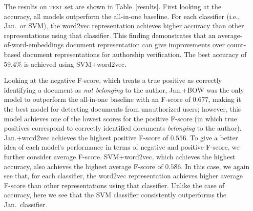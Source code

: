 \documentclass[11pt]{article}
\newcommand\test{\textsc{test}\xspace}
\begin{document}

The results on \test set are shown in Table~\ref{results}. First
looking at the accuracy, all models outperform the all-in-one
baseline. For each classifier (i.e., Jan.\ or SVM), the word2vec
representation achieves higher accuracy than other representations
using that classifier. This finding demonstrates that an
average-of-word-embeddings document representation can give
improvements over count-based document representations for authorship
verification. The best accuracy of $59.4\%$ is achieved using
SVM+word2vec.

Looking at the negative F-score, which treats a true positive as
correctly identifying a document as \emph{not belonging} to the
author, Jan.+BOW was the only model to outperform the all-in-one
baseline with an F-score of $0.677$, making it the best model for
detecting documents from unauthorized users; however, this model
achieves one of the lowest scores for the positive F-score (in which
true positives correspond to correctly identified documents
\emph{belonging} to the author). Jan.+word2vec achieves the highest
positive F-score of $0.556$. To give a better idea of each model's performance in terms of negative
and positive F-score, we further consider average
F-score. SVM+word2vec, which achieves the highest accuracy, also
achieves the highest average F-score of $0.586$. In this case, we
again see that, for each classifier, the word2vec representation
achieves higher average F-score than other representations using that
classifier. Unlike the case of accuracy, here we see that the SVM
classifier consistently outperforms the Jan.\ classifier.
\end{document}
